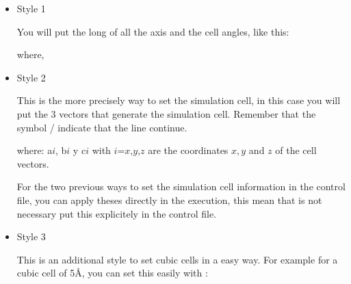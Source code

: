 \begin{itemize} 
\item{Style 1}

You will put the long of all the axis and the cell angles, like this:

\noindent
where,


\item{Style 2}

This is the more precisely way to set the simulation cell, in this case you
will put the 3 vectors that generate the simulation cell. Remember that the
symbol / indicate that the line continue.


\noindent
where: a${i}$, b${i}$ y c${i}$ with $i$={$x$,$y$,$z$} are the coordinates $x, y$
and $z$ of the cell vectors.

For the two previous ways to set the simulation cell information in the control
file, you can apply theses directly in the execution, this mean that is not
necessary put this explicitely in the control file.


\item{Style 3}

This is an additional style to set cubic cells in a easy way. For example for a
cubic cell of 5\AA, you can set this easily with :


\end{itemize}

